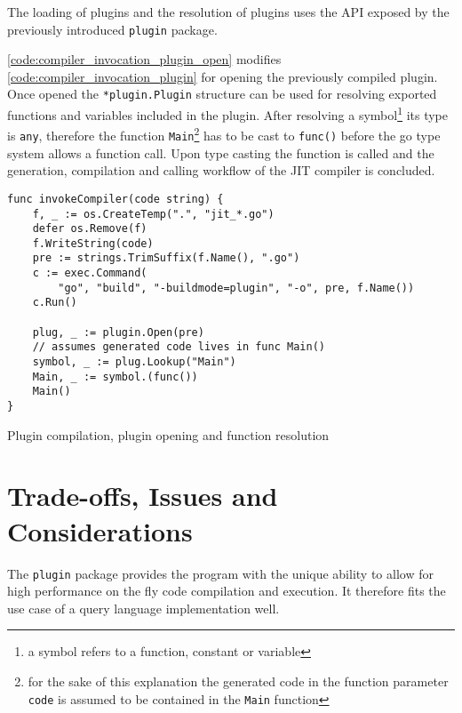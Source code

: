 The loading of plugins and the resolution of plugins uses the API exposed by
the previously introduced \texttt{plugin} package.

\autoref{code:compiler_invocation_plugin_open} modifies
\autoref{code:compiler_invocation_plugin} for opening the previously compiled
plugin. Once opened the \texttt{*plugin.Plugin} structure can be used
for resolving exported functions and variables included in the plugin. After
resolving a symbol\footnote{a symbol refers to a function, constant or
variable} its type is \texttt{any}, therefore the function
\texttt{Main}\footnote{for the sake of this explanation the generated
code in the function parameter \texttt{code} is assumed to be contained in the
\texttt{Main} function} has to be cast to \texttt{func()}
before the go type system allows a function call. Upon type casting the
function is called and the generation, compilation and calling workflow of the
JIT compiler is concluded.

\begin{listing}[H]
    \begin{verbatim}
func invokeCompiler(code string) {
    f, _ := os.CreateTemp(".", "jit_*.go")
    defer os.Remove(f)
    f.WriteString(code)
    pre := strings.TrimSuffix(f.Name(), ".go")
    c := exec.Command(
        "go", "build", "-buildmode=plugin", "-o", pre, f.Name())
    c.Run()

    plug, _ := plugin.Open(pre)
    // assumes generated code lives in func Main()
    symbol, _ := plug.Lookup("Main")
    Main, _ := symbol.(func())
    Main()
}
    \end{verbatim}
    \caption{Plugin compilation, plugin opening and function resolution}
    \label{code:compiler_invocation_plugin_open}
\end{listing}

\section{Trade-offs, Issues and Considerations}

The \texttt{plugin} package provides the program with the unique ability to
allow for high performance on the fly code compilation and execution. It
therefore fits the use case of a query language implementation well.

